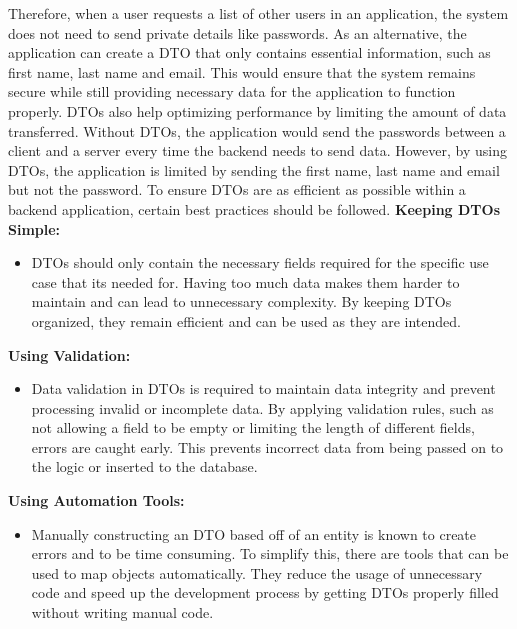     Therefore, when a user requests a list of other users in an application, the system does not need to send private details like passwords. As an alternative, the application can create a DTO that only contains essential information, such as first name, last name and email. This would ensure that the system remains secure while still providing necessary data for the application to function properly. \newline
    DTOs also help optimizing performance by limiting the amount of data transferred. Without DTOs, the application would send the passwords between a client and a server every time the backend needs to send data. However, by using DTOs, the application is limited by sending the first name, last name and email but not the password. \newline 
    To ensure DTOs are as efficient as possible within a backend application, certain best practices should be followed. \newline 
    \textbf{Keeping DTOs Simple:}
        \begin{itemize}
            \item DTOs should only contain the necessary fields required for the specific use case that its needed for. Having too much data makes them harder to maintain and can lead to unnecessary complexity. By keeping DTOs organized, they remain efficient and can be used as they are intended.
        \end{itemize}
    \textbf{Using Validation:}
        \begin{itemize}
            \item Data validation in DTOs is required to maintain data integrity and prevent processing invalid or incomplete data. By applying validation rules, such as not allowing a field to be empty or limiting the length of different fields, errors are caught early. This prevents incorrect data from being passed on to the logic or inserted to the database.
        \end{itemize}
    \textbf{Using Automation Tools:}
        \begin{itemize}
            \item Manually constructing an DTO based off of an entity is known to create errors and to be time consuming. To simplify this, there are tools that can be used to map objects automatically. They reduce the usage of unnecessary code and speed up the development process by getting DTOs properly filled without writing manual code.
        \end{itemize}
